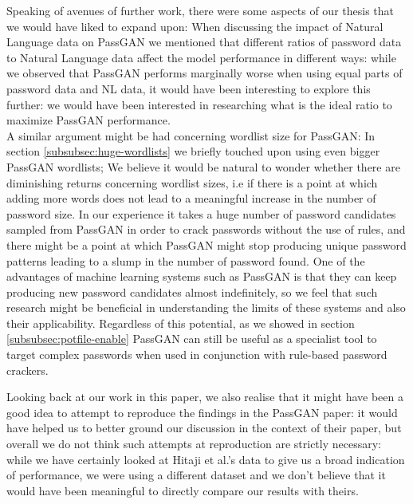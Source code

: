 Speaking of avenues of further work, there were some aspects of our thesis that we would have liked to expand upon:
When discussing the impact of Natural Language data on PassGAN we mentioned that different ratios of password data to Natural Language data affect the model performance in different ways: while we observed 
that PassGAN performs marginally worse when using equal parts of password data and NL data, it would have been interesting to explore this further: we would have been interested in researching what is the ideal ratio to maximize PassGAN performance. \\
A similar argument might be had concerning wordlist size for PassGAN: In section \ref{subsubsec:huge-wordlists} we briefly touched upon using even bigger PassGAN wordlists; We believe it would be natural to wonder whether there are diminishing returns concerning wordlist sizes, i.e if there is a point at which adding more words does not lead to a meaningful increase in the number of password size.
In our experience it takes a huge number of password candidates sampled from PassGAN in order to crack passwords without the use of rules, and there might be a point at which PassGAN might stop producing 
unique password patterns leading to a slump in the number of password found. One of the advantages of machine learning systems such as PassGAN is that they can keep producing new password candidates almost 
indefinitely, so we feel that such research might be beneficial in understanding the limits of these systems and also their applicability. Regardless of this potential, as we showed in section 
\ref{subsubsec:potfile-enable} PassGAN can still be useful as a specialist tool to target complex passwords when used in conjunction with rule-based password crackers.

Looking back at our work in this paper, we also realise that it might have been a good idea to attempt to reproduce the findings in the PassGAN paper: it would have helped us to better ground our discussion 
in the context of their paper, but overall we do not think such attempts at reproduction are strictly necessary: while we have certainly looked at Hitaji et al.'s data to give us a broad indication of performance, we were using a different dataset and we don't believe that it would have been meaningful to directly compare our results with theirs.

